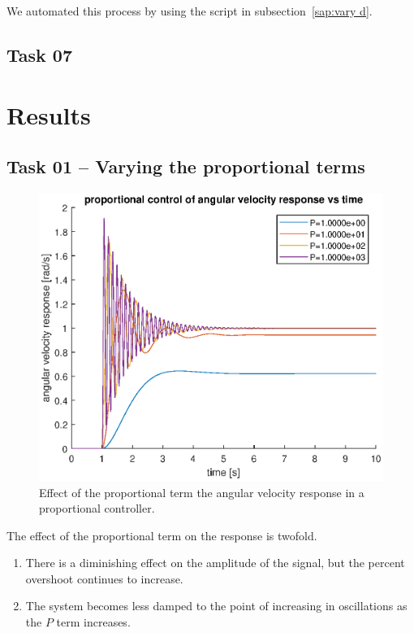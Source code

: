 \documentclass[12pt]{article}
\begin{document}
We automated this process by using the script in  subsection~\ref{sap:vary d}.

\subsection{Task 07}

\section{Results}

\subsection{Task 01 -- Varying the proportional terms}

\begin{figure}
    \centering
    \includegraphics[width=\linewidth]{img/task01_varying_p.eps}
    \caption{Effect of the proportional term the angular velocity response in a proportional controller.}
    \label{fig:p on angular velocity}
\end{figure}

The effect of the proportional term on the response is twofold.
\begin{enumerate}
    \item There is a diminishing effect on the amplitude of the signal, but the percent overshoot continues to increase.
    \item The system becomes less damped to the point of increasing in oscillations as the $P$ term increases.
\end{enumerate}
\end{document}
